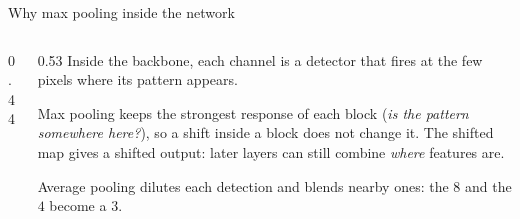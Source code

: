 \documentclass[11pt,aspectratio=169]{beamer}
\begin{document}
\begin{whiteframe}{Why max pooling inside the network}
    \setlength{\parskip}{5pt}

    \begin{columns}[c,onlytextwidth]
        \begin{column}{0.44\textwidth}
            \centering
            
        \end{column}
        \begin{column}{0.53\textwidth}
            \small\setlength{\parskip}{7pt}%
            Inside the backbone, each channel is a detector that fires at
            the few pixels where its pattern appears.

            Max pooling keeps the strongest response of each block (\textit{is
                the pattern somewhere here?}), so a shift inside a block does not
            change it. The shifted map gives a shifted output: later layers
            can still combine \textit{where} features are.

            Average pooling dilutes each detection and blends nearby ones:
            the $8$ and the $4$ become a $3$.
        \end{column}
    \end{columns}


\end{whiteframe}
\end{document}
